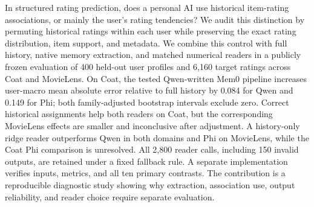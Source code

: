 In structured rating prediction, does a personal AI use historical item-rating associations, or mainly the user's rating tendencies? We audit this distinction by permuting historical ratings within each user while preserving the exact rating distribution, item support, and metadata. We combine this control with full history, native memory extraction, and matched numerical readers in a publicly frozen evaluation of 400 held-out user profiles and 6,160 target ratings across Coat and MovieLens. On Coat, the tested Qwen-written Mem0 pipeline increases user-macro mean absolute error relative to full history by 0.084 for Qwen and 0.149 for Phi; both family-adjusted bootstrap intervals exclude zero. Correct historical assignments help both readers on Coat, but the corresponding MovieLens effects are smaller and inconclusive after adjustment. A history-only ridge reader outperforms Qwen in both domains and Phi on MovieLens, while the Coat Phi comparison is unresolved. All 2,800 reader calls, including 150 invalid outputs, are retained under a fixed fallback rule. A separate implementation verifies inputs, metrics, and all ten primary contrasts. The contribution is a reproducible diagnostic study showing why extraction, association use, output reliability, and reader choice require separate evaluation.
